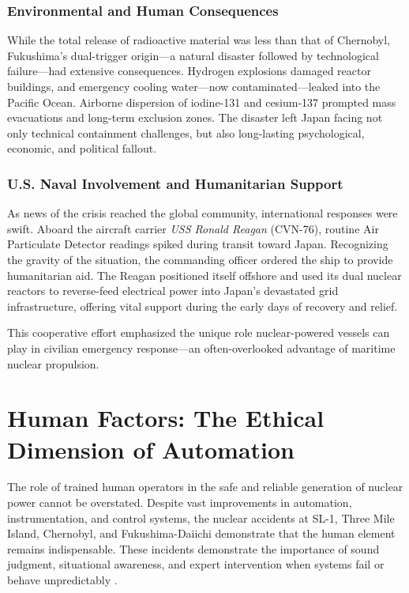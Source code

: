 \documentclass[12pt]{article}
\begin{document}
\subsubsection{Environmental and Human Consequences}
While the total release of radioactive material was less than that of Chernobyl, Fukushima's dual-trigger origin—a natural disaster followed by technological failure—had extensive consequences. Hydrogen explosions damaged reactor buildings, and emergency cooling water—now contaminated—leaked into the Pacific Ocean. Airborne dispersion of iodine-131 and cesium-137 prompted mass evacuations and long-term exclusion zones. The disaster left Japan facing not only technical containment challenges, but also long-lasting psychological, economic, and political fallout.

\subsubsection{U.S. Naval Involvement and Humanitarian Support}
As news of the crisis reached the global community, international responses were swift. Aboard the aircraft carrier \textit{USS Ronald Reagan} (CVN-76), routine Air Particulate Detector readings spiked during transit toward Japan. Recognizing the gravity of the situation, the commanding officer ordered the ship to provide humanitarian aid. The Reagan positioned itself offshore and used its dual nuclear reactors to reverse-feed electrical power into Japan's devastated grid infrastructure, offering vital support during the early days of recovery and relief.

This cooperative effort emphasized the unique role nuclear-powered vessels can play in civilian emergency response—an often-overlooked advantage of maritime nuclear propulsion.

\section{Human Factors: The Ethical Dimension of Automation}
\label{sec:humanfactors}

The role of trained human operators in the safe and reliable generation of nuclear power cannot be overstated. Despite vast improvements in automation, instrumentation, and control systems, the nuclear accidents at SL-1, Three Mile Island, Chernobyl, and Fukushima-Daiichi demonstrate that the human element remains indispensable. These incidents demonstrate the importance of sound judgment, situational awareness, and expert intervention when systems fail or behave unpredictably \autocite{moderninstruments}.
\end{document}
